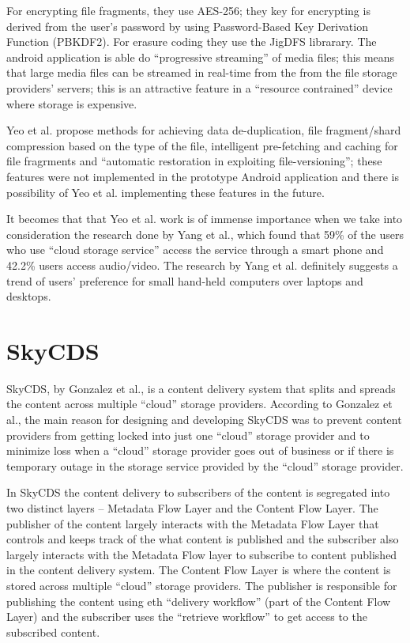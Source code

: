 For encrypting file fragments, they use AES-256; they key for
encrypting is derived from the user's password by using Password-Based
Key Derivation Function (PBKDF2)\cite{kaliski}. For erasure coding
they use the JigDFS librarary\cite{jigdfs}. The android application is
able do ``progressive streaming'' of media files; this means that
large media files can be streamed in real-time from the from the file
storage providers' servers; this is an attractive feature in a
``resource contrained'' device where storage is expensive.

Yeo et al. propose methods for achieving data de-duplication, file
fragment/shard compression based on the type of the file, intelligent
pre-fetching and caching for file fragrments and ``automatic
restoration in exploiting file-versioning''; these features were not
implemented in the prototype Android application and there is
possibility of Yeo et al. implementing these features in the future.

It becomes that that Yeo et al. work is of immense importance when we
take into consideration the research done by Yang et al., which found
that 59\% of the users who use ``cloud storage service'' access the
service through a smart phone and 42.2\% users access
audio/video\cite{yang}. The research by Yang et al. definitely
suggests a trend of users' preference for small hand-held computers
over laptops and desktops.

\section{SkyCDS}\label{2-skycds-sec}

SkyCDS, by Gonzalez et al., is a content delivery system that splits
and spreads the content across multiple ``cloud'' storage
providers\cite{skycds}. According to Gonzalez et al., the main reason
for designing and developing SkyCDS was to prevent content providers
from getting locked into just one ``cloud'' storage provider and to
minimize loss when a ``cloud'' storage provider goes out of business
or if there is temporary outage in the storage service provided by the
``cloud'' storage provider.

In SkyCDS the content delivery to subscribers of the content is
segregated into two distinct layers -- Metadata Flow Layer and the
Content Flow Layer. The publisher of the content largely interacts
with the Metadata Flow Layer that controls and keeps track of the what
content is published and the subscriber also largely interacts with
the Metadata Flow layer to subscribe to content published in the
content delivery system. The Content Flow Layer is where the content
is stored across multiple ``cloud'' storage providers. The publisher
is responsible for publishing the content using eth ``delivery
workflow'' (part of the Content Flow Layer) and the subscriber uses
the ``retrieve workflow'' to get access to the subscribed content.

